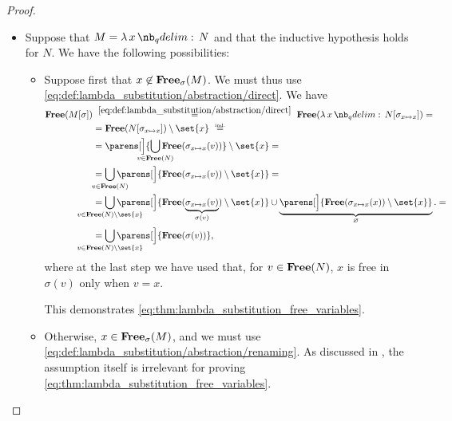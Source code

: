 \begin{proof}
\begin{itemize}
    \item Suppose that \( M = \qabs x N \) and that the inductive hypothesis holds for \( N \). We have the following possibilities:
    \begin{itemize}
      \item Suppose first that \( x \not\in \op*{Free}_\sigma(M) \). We must thus use \eqref{eq:def:lambda_substitution/abstraction/direct}. We have
      \begin{align*}
        \op*{Free}(M[\sigma])
        &\reloset{\eqref{eq:def:lambda_substitution/abstraction/direct}} =
        \op*{Free}(\qabs x N[\sigma_{x \mapsto x}])
        = \\ &=
        \op*{Free}(N[\sigma_{x \mapsto x}]) \setminus \set{ x }
        \reloset{\T{ind.}} = \\ &=
        \parens[\Big]{ \bigcup_{\mathclap{v \in \op*{Free}(N)}} \op*{Free}(\sigma_{x \mapsto x}(v)) } \setminus \set{ x }
        = \\ &=
        \bigcup_{\mathclap{v \in \op*{Free}(N)}} \parens[\Big]{ \op*{Free}(\sigma_{x \mapsto x}(v)) \setminus \set{ x } }
        = \\ &=
        \bigcup_{\mathclap{v \in \op*{Free}(N) \setminus \set{ x }}} \parens[\Big]{ \op*{Free}(\underbrace{\sigma_{x \mapsto x}(v)}_{\sigma(v)}) \setminus \set{ x } } \cup \underbrace{\parens[\Big]{ \op*{Free}(\sigma_{x \mapsto x}(x)) \setminus \set{ x } }}_\varnothing.
        = \\ &=
        \bigcup_{\mathclap{v \in \op*{Free}(N) \setminus \set{ x }}} \parens[\Big]{ \op*{Free}(\sigma(v)) },
      \end{align*}
      where at the last step we have used that, for \( v \in \op*{Free}(N) \), \( x \) is free in \( \sigma(v) \) only when \( v = x \).

      This demonstrates \eqref{eq:thm:lambda_substitution_free_variables}.

      \item Otherwise, \( x \in \op*{Free}_\sigma(M) \), and we must use \eqref{eq:def:lambda_substitution/abstraction/renaming}. As discussed in , the assumption itself is irrelevant for proving \eqref{eq:thm:lambda_substitution_free_variables}.


\end{itemize}
\end{itemize}
\end{proof}
